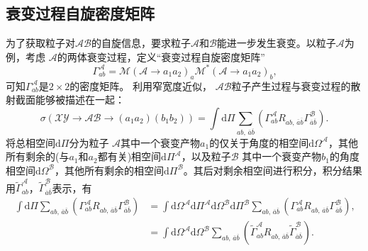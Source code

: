 \subsection{衰变过程自旋密度矩阵}
\label{sec:twoptwoptwo}
为了获取粒子对$ \mathcal{A} \mathcal{B} $的自旋信息，要求粒子$ \mathcal{A}$和$\mathcal{B}$能进一步发生衰变。以粒子$ \mathcal{A}$为例，考虑 $\mathcal{A}$的两体衰变过程，定义“衰变过程自旋密度矩阵”
\begin{equation*}
\Gamma_{ab}^{ \mathcal{A}}=\mathcal{M}( \mathcal{A} \rightarrow a_1 a_2)_{a} \mathcal{M}^{\ast} ( \mathcal{A} \rightarrow a_1 a_2)_{b}\text{,}
\tag{2.12}
\end{equation*}
\noindent 可知$\Gamma_{ab}^{ \mathcal{A}}$是$2\times 2$的密度矩阵。
利用窄宽度近似， $\mathcal{A} \mathcal{B} $粒子产生过程与衰变过程的散射截面能够被描述在一起：
\begin{equation*}
\sigma \left( \mathcal{X} \mathcal{Y}  \rightarrow  \mathcal{A} \mathcal{B}  \rightarrow (a_1 a_2)(b_1 b_2) \right)=\int \text{d}\Pi \sum_{ab\text{, } \overline{a} \overline{b}} \left( \Gamma_{ab}^{ \mathcal{A}} R_{ab\text{, }\overline{a} \overline{b} } \Gamma_{\overline{a} \overline{b}}^{ \mathcal{B} } \right)\text{.}
\tag{2.13}
\end{equation*}
将总相空间$\text{d}\Pi $分为粒子 $\mathcal{A}$其中一个衰变产物$a_1$的仅关于角度的相空间$\text{d}\Omega^{ \mathcal{A}}$，其他所有剩余的(与$a_1$和$a_2$都有关)相空间$\text{d}\Pi^{ \mathcal{A}}$，以及粒子$ \mathcal{B}$ 其中一个衰变产物$b_1$的角度相空间$\text{d}\Omega^{ \mathcal{B} }$，其他所有剩余的相空间$\text{d}\Pi^{ \mathcal{B} }$。其后对剩余相空间进行积分，积分结果用$\tilde{\Gamma}_{ab}^{ \mathcal{A}}$，$\tilde{\Gamma}_{\overline{a} \overline{b}}^{ \mathcal{B} }$表示，有
\begin{equation*}
\begin{aligned}
\int \text{d}\Pi \sum_{ab\text{, } \overline{a} \overline{b}} \left( \Gamma_{ab}^{ \mathcal{A}} R_{ab\text{, }\overline{a} \overline{b} } \Gamma_{\overline{a} \overline{b}}^{ \mathcal{B} } \right)
&=\int \text{d}\Omega^{ \mathcal{A}} \text{d}\Pi^{ \mathcal{A}} \text{d}\Omega^{ \mathcal{B} } \text{d}\Pi^{ \mathcal{B} } \sum_{ab\text{, } \overline{a} \overline{b}} \left( \Gamma_{ab}^{ \mathcal{A}} R_{ab\text{, }\overline{a} \overline{b} } \Gamma_{\overline{a} \overline{b}}^{ \mathcal{B} } \right)\text{,}\\
&=\int \text{d}\Omega^{ \mathcal{A}} \text{d}\Omega^{ \mathcal{B} } \sum_{ab\text{, } \overline{a} \overline{b}} \left( \tilde{\Gamma}_{ab}^{ \mathcal{A}} R_{ab\text{, }\overline{a} \overline{b} } \tilde{\Gamma}_{\overline{a} \overline{b}}^{ \mathcal{B} } \right)\text{.}
\end{aligned}
\tag{2.14}
\end{equation*}

